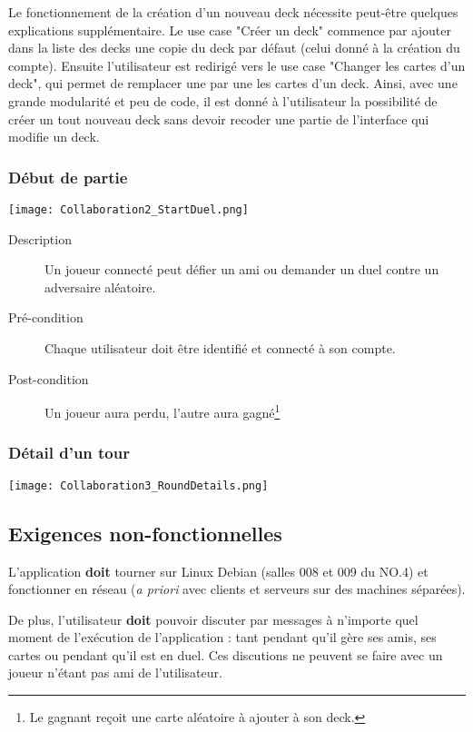 \documentclass{article}
\begin{document}
			Le fonctionnement de la création d'un nouveau deck nécessite peut-être quelques explications
			supplémentaire. Le use case "Créer un deck" commence par ajouter dans la liste des decks
			une copie du deck par défaut (celui donné à la création du compte). Ensuite l'utilisateur
			est redirigé vers le use case "Changer les cartes d'un deck", qui permet de remplacer
			une par une les cartes d'un deck. Ainsi, avec une grande modularité et peu de code,
			il est donné à l'utilisateur la possibilité de créer un tout nouveau deck sans devoir recoder une partie
			de l'interface qui modifie un deck.

		\subsubsection{Début de partie}
			\begin{center}\texttt{[image: Collaboration2\_StartDuel.png]}\end{center}

			\begin{description}
				\item[Description] Un joueur connecté peut défier un ami ou demander un duel contre un adversaire aléatoire.
				\item[Pré-condition] Chaque utilisateur doit être identifié et connecté à son compte.
				\item[Post-condition] Un joueur aura perdu, l'autre aura gagné\footnote{Le gagnant reçoit une carte aléatoire à ajouter à son deck.}
			\end{description}

		\subsubsection{Détail d'un tour}
			\begin{center}\texttt{[image: Collaboration3\_RoundDetails.png]}\end{center}

	\subsection{Exigences non-fonctionnelles}
		L'application \textbf{doit} tourner sur Linux Debian (salles 008 et 009 du NO.4) et fonctionner en réseau (\textit{a priori} avec clients
		et serveurs sur des machines séparées).

		De plus, l'utilisateur \textbf{doit} pouvoir discuter par messages à n'importe quel moment de l'exécution de l'application : tant pendant
		qu'il gère ses amis, ses cartes ou pendant qu'il est en duel. Ces discutions ne peuvent se faire avec un joueur
		n'étant pas ami de l'utilisateur.
\end{document}

